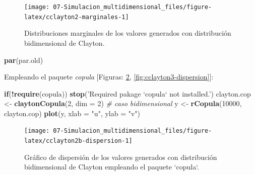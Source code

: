 \documentclass[
]{book}
\newenvironment{Shaded}{\begin{snugshade}}{\end{snugshade}}
\newcommand{\CommentTok}[1]{\textcolor[rgb]{0.56,0.35,0.01}{\textit{#1}}}
\newcommand{\ControlFlowTok}[1]{\textcolor[rgb]{0.13,0.29,0.53}{\textbf{#1}}}
\newcommand{\DataTypeTok}[1]{\textcolor[rgb]{0.13,0.29,0.53}{#1}}
\newcommand{\DecValTok}[1]{\textcolor[rgb]{0.00,0.00,0.81}{#1}}
\newcommand{\KeywordTok}[1]{\textcolor[rgb]{0.13,0.29,0.53}{\textbf{#1}}}
\newcommand{\NormalTok}[1]{#1}
\newcommand{\OperatorTok}[1]{\textcolor[rgb]{0.81,0.36,0.00}{\textbf{#1}}}
\newcommand{\StringTok}[1]{\textcolor[rgb]{0.31,0.60,0.02}{#1}}
\theoremstyle{break}
\theoremstyle{definition}
\theoremstyle{definition}
\theoremstyle{definition}
\theoremstyle{remark}
\begin{document}
\begin{enumerate}
  \begin{figure}[!htb]

  {\centering \texttt{[image: 07-Simulacion\_multidimensional\_files/figure-latex/cclayton2-marginales-1]} 

  }

  \caption{Distribuciones marginales de los valores generados con distribución bidimensional de Clayton.}\label{fig:cclayton2-marginales}
  \end{figure}

\begin{Shaded}
\begin{Highlighting}[]
\KeywordTok{par}\NormalTok{(par.old)}
\end{Highlighting}
\end{Shaded}

  Empleando el paquete \emph{copula} {[}Figuras: \ref{fig:cclayton2b-dispersion}, \ref{fig:cclayton3-dispersion}{]}:

\begin{Shaded}
\begin{Highlighting}[]
\ControlFlowTok{if}\NormalTok{(}\OperatorTok{!}\KeywordTok{require}\NormalTok{(copula)) }\KeywordTok{stop}\NormalTok{(}\StringTok{'Required pakage `copula` not installed.'}\NormalTok{)}
\NormalTok{clayton.cop <-}\StringTok{ }\KeywordTok{claytonCopula}\NormalTok{(}\DecValTok{2}\NormalTok{, }\DataTypeTok{dim =} \DecValTok{2}\NormalTok{) }\CommentTok{# caso bidimensional}
\NormalTok{y <-}\StringTok{ }\KeywordTok{rCopula}\NormalTok{(}\DecValTok{10000}\NormalTok{, clayton.cop)}
\KeywordTok{plot}\NormalTok{(y, }\DataTypeTok{xlab =} \StringTok{"u"}\NormalTok{, }\DataTypeTok{ylab =} \StringTok{"v"}\NormalTok{)}
\end{Highlighting}
\end{Shaded}

  \begin{figure}[!htb]

  {\centering \texttt{[image: 07-Simulacion\_multidimensional\_files/figure-latex/cclayton2b-dispersion-1]} 

  }

  \caption{Gráfico de dispersión de los valores generados con distribución bidimensional de Clayton empleando el paquete `copula`.}\label{fig:cclayton2b-dispersion}
  \end{figure}


\end{enumerate}
\end{document}
